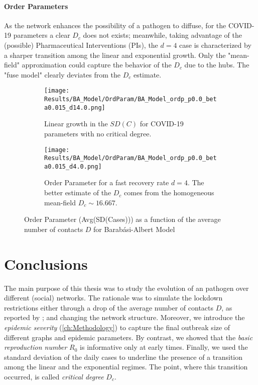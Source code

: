 \documentclass[a4paper,10pt,twoside]{book} %
\theoremstyle{definition}
\begin{document}
\subsubsection*{Order Parameters}
As the network enhances the possibility of a pathogen to diffuse, for the COVID-19 parameters a clear $D_c$ does not exists; meanwhile, taking advantage of the (possible) Pharmaceutical Interventions (PIs), the $d = 4$ case is characterized by a sharper transition among the linear and exponential growth. Only the "mean-field" approximation could capture the behavior of the $ D_c$ due to the hubs. The "fuse model" clearly deviates from the $ D_c$ estimate. 
\begin{figure}[t]
	\begin{subfigure}[t]{0.48\linewidth}
		\centering
		\texttt{[image: Results/BA\_Model/OrdParam/BA\_Model\_ordp\_p0.0\_beta0.015\_d14.0.png]}
		\caption{Linear growth in the $SD(C)$ for COVID-19 parameters with no critical degree.}
		\label{fig:Ordp_BA_d14}
	\end{subfigure}
	\hfill
	\begin{subfigure}[t]{0.48\linewidth}
		\centering
		\texttt{[image: Results/BA\_Model/OrdParam/BA\_Model\_ordp\_p0.0\_beta0.015\_d4.0.png]}
		\caption{Order Parameter for a fast recovery rate $ d = 4$. The better estimate of the $ D_c$ comes from the homogeneous mean-field $ D_c \sim 16.667$.}
		\label{fig:Ordp_BA_COVID_d1}
	\end{subfigure}
	\caption{Order Parameter (Avg(SD(Cases))) as a function of the average number of contacts $ D$ for Barabási-Albert Model}
	\label{fig:Ordp_BA_COVID}
\end{figure}


\chapter{Conclusions}
The main purpose of this thesis was to study the evolution of an pathogen over different (social) networks. The rationale was to simulate the lockdown restrictions either through a drop of the average number of contacts $D$, as reported by \cite{Liu::2021_Review_SContactPattern}; and changing the network structure. Moreover, we introduce the \textit{epidemic severity} (\autoref{ch:Methodology}) to capture the final outbreak size of different graphs and epidemic parameters. By contrast, we showed that the \textit{basic reproduction number} $ R_0 $ is informative only at early times.
Finally, we used the standard deviation of the daily cases to underline the presence of a transition among the linear and the exponential regimes. The point, where this transition occurred, is called \textit{critical degree}  $D_c$.
\end{document}
